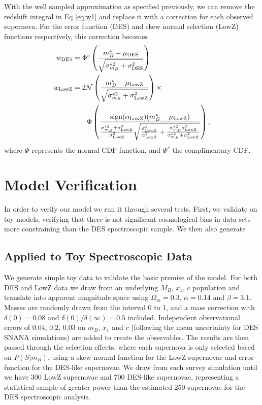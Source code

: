 \documentclass[a4paper,fleqn,usenatbib]{mnras}
\begin{document}
With the well sampled approximation as specified previously, we can remove the redshift integral in Eq \eqref{eq:w1} and replace it with a correction for each observed supernova. For the error function (DES) and skew normal selection (LowZ) functions respectively, this correction becomes
\begin{align}
w_{\rm DES} &= \Phi^c\left(  \frac{m^*_B - \mu_{\rm DES}}{\sqrt{\sigma^{*2}_{m_B} + \sigma_{\rm DES}^2}}  \right) \label{eq:seldes}\\
w_{\rm LowZ} &= 2\mathcal{N}\left( \frac{m_B^* - \mu_{\rm LowZ}}{\sqrt{\sigma^{*2}_{m_B} + \sigma_{\rm LowZ}^2}}\right) \times \notag\\
&\quad\quad \Phi\left(  \frac{{\rm sign}(\alpha_{\rm LowZ})(m_B^* - \mu_{\rm LowZ})}{\frac{\sigma_{m_B}^{*2} + \sigma^2_{\rm LowZ}}{\sigma^2_{\rm LowZ}} \sqrt{\frac{\sigma^2_{\rm LowZ}}{\alpha^2_{\rm LowZ}} + \frac{\sigma_{m_B}^{*2} \sigma^2_{\rm LowZ}}{\sigma_{m_B}^{*2} + \sigma^2_{\rm LowZ}}} }\right), \label{eq:sellowz}
\end{align}
where $\Phi$ represents the normal CDF function, and $\Phi^c$ the complimentary CDF.








\section{Model Verification}
\label{sec:verification}

In order to verify our model we run it through several tests. First, we validate on toy models, verifying that there is not significant cosmological bias in data sets more constraining than the DES spectroscopic sample. We then also generate 

\subsection{Applied to Toy Spectroscopic Data}
\label{sec:toy}

We generate simple toy data to validate the basic premise of the model. For both DES and LowZ data we draw from an underlying $M_B$, $x_1$, $c$ population and translate into apparent magnitude space using $\Omega_m = 0.3$, $\alpha= 0.14$ and $\beta = 3.1$. Masses are randomly drawn from the interval 0 to 1, and a mass correction with $\delta(0) = 0.08$ and $\delta(0)/\delta(\infty) =0.5$ included. Independent observational errors of $0.04$, $0.2$, $0.03$ on $m_B$, $x_1$ and $c$ (following the mean uncertainty for DES SNANA simulations) are added to create the observables. The results are then passed through the selection effects, where each supernova is only selected based on $P(S|m_B)$, using a skew normal function for the LowZ supernovae and error function for the DES-like supernovae. We draw from each survey simulation until we have 300 LowZ supernovae and 700 DES-like supernovae, representing a statistical sample of greater power than the estimated 250 supernovae for the DES spectroscopic analysis.
\end{document}
